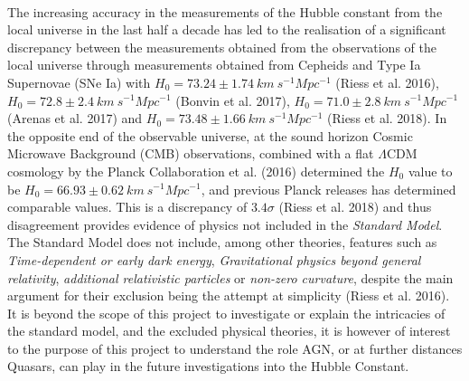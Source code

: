 \documentclass[a4paper, 12pt, twoside]{article}
\begin{document}
\\
The increasing accuracy in the measurements of the Hubble constant from the local universe in the last half a decade has led to the realisation of a significant discrepancy between the measurements obtained from the observations of the local universe through measurements obtained from Cepheids and Type Ia Supernovae (SNe Ia) with $H_{0}=73.24 \pm 1.74\ km\ s^{-1}Mpc^{-1}$ (Riess et al. 2016), $H_{0}=72.8 \pm 2.4\ km\ s^{-1}Mpc^{-1}$ (Bonvin et al. 2017), $H_{0}=71.0 \pm 2.8\ km\ s^{-1}Mpc^{-1}$ (Arenas et al. 2017) and $H_{0}=73.48 \pm 1.66\ km\ s^{-1}Mpc^{-1}$ (Riess et al. 2018). In the opposite end of the observable universe, at the sound horizon Cosmic Microwave Background (CMB) observations, combined with a flat $\Lambda$CDM cosmology by the Planck Collaboration et al. (2016) determined the $H_{0}$ value to be $H_{0}=66.93 \pm 0.62\ km\ s^{-1}Mpc^{-1}$, and previous Planck releases has determined comparable values. This is a discrepancy of $3.4\sigma$ (Riess et al. 2018) and thus disagreement provides evidence of physics not included in the \emph{Standard Model}. The Standard Model does not include, among other theories, features such as \emph{Time-dependent or early dark energy}, \emph{Gravitational physics beyond general relativity}, \emph{additional relativistic particles} or \emph{non-zero curvature}, despite the main argument for their exclusion being the attempt at simplicity (Riess et al. 2016). It is beyond the scope of this project to investigate or explain the intricacies of the standard model, and the excluded physical theories, it is however of interest to the purpose of this project to understand the role AGN, or at further distances Quasars, can play in the future investigations into the Hubble Constant.
\end{document}
